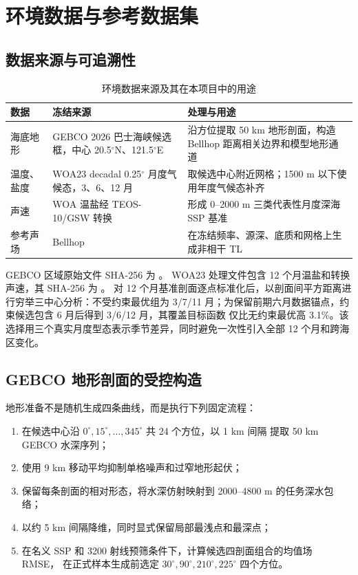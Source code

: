 \documentclass[UTF8,11pt]{ctexart}
\begin{document}
\section{环境数据与参考数据集}

\subsection{数据来源与可追溯性}

\begin{table}[H]
\centering
\caption{环境数据来源及其在本项目中的用途}
\begin{tabularx}{\textwidth}{L{3.1cm}L{4.2cm}Y}
\toprule
数据 & 冻结来源 & 处理与用途 \\
\midrule
海底地形 & GEBCO 2026 巴士海峡候选框，中心 20.5$^\circ$N、121.5$^\circ$E &
沿方位提取 50 km 地形剖面，构造 Bellhop 距离相关边界和模型地形通道 \\
温度、盐度 & WOA23 decadal 0.25$^\circ$ 月度气候态，3、6、12 月 &
取候选中心附近网格；1500 m 以下使用年度气候态补齐 \\
声速 & WOA 温盐经 TEOS-10/GSW 转换 &
形成 0--2000 m 三类代表性月度深海 SSP 基准 \\
参考声场 & Bellhop &
在冻结频率、源深、底质和网格上生成非相干 TL \\
\bottomrule
\end{tabularx}
\end{table}

GEBCO 区域原始文件 SHA-256 为
。
WOA23 处理文件包含 12 个月温盐和转换声速，其 SHA-256 为
。
对 12 个月基准剖面逐点标准化后，以剖面间平方距离进行穷举三中心分析：不受约束最优组为
3/7/11 月；为保留前期六月数据锚点，约束候选包含 6 月后得到 3/6/12 月，其覆盖目标函数
仅比无约束最优高 3.1\%。该选择用三个真实月度型态表示季节差异，同时避免一次性引入全部
12 个月和跨海区变化。

\subsection{GEBCO 地形剖面的受控构造}

地形准备不是随机生成四条曲线，而是执行下列固定流程：
\begin{enumerate}
  \item 在候选中心沿 $0^\circ,15^\circ,\ldots,345^\circ$ 共 24 个方位，以 1 km 间隔
  提取 50 km GEBCO 水深序列；
  \item 使用 9 km 移动平均抑制单格噪声和过窄地形起伏；
  \item 保留每条剖面的相对形态，将水深仿射映射到 2000--4800 m 的任务深水包络；
  \item 以约 5 km 间隔降维，同时显式保留局部最浅点和最深点；
  \item 在名义 SSP 和 3200 射线预筛条件下，计算候选四剖面组合的均值场 RMSE，
  在正式样本生成前选定 $30^\circ,90^\circ,210^\circ,225^\circ$ 四个方位。
\end{enumerate}
\end{document}
